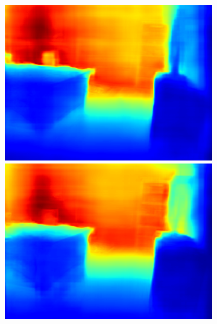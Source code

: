 \begin{figure}[htb]
\begin{subfigure}{0.15\linewidth}
\begin{minipage}[t]{1\linewidth}
  \includegraphics[width=1\linewidth]{figure/nyu_result/bedroom_rgb_01149.png}
  \includegraphics[width=1\linewidth]{figure/nyu_without/bedroom_rgb_01149.png}
  \end{minipage}%
  \end{subfigure}
  \begin{subfigure}{0.15\linewidth}
    

\end{subfigure}
\end{figure}
